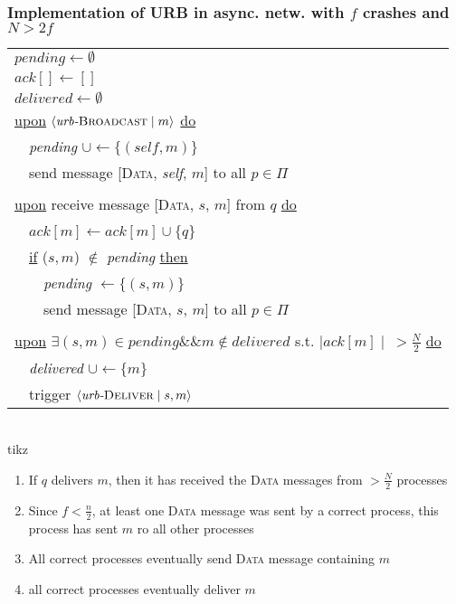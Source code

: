 \documentclass{article}
\begin{document}
\begin{adjustwidth}{2em}{2em}
\begin{adjustwidth}{2em}{2em}
			\subsubsection{Implementation of URB in async. netw. with $f$ crashes and $N > 2f$}					
			\begin{center}
				\begin{tabular}{l}
					$\textit{pending} \leftarrow \emptyset$ \\
					$ack[] \leftarrow []$ \\
					$\textit{delivered} \leftarrow \emptyset$
					\\
					\underline{upon} $\langle \textit{urb-}\textsc{Broadcast} \mid m \rangle$ \underline{do} \\
					\ \ \textit{pending} $\cup \leftarrow \{ (\textit{self}, m) \}$ \\
					\ \ send message [\textsc{Data}, \textit{self}, $m$] to all $p \in \Pi$ \\
					\\
					\underline{upon} receive message [\textsc{Data}, $s$, $m$] from $q$ \underline{do} \\
					\ \ $ack[m] \leftarrow ack[m] \cup \{ q \}$ \\
					\ \ \underline{if} ($s,m$) $\not\in$ \textit{pending} \underline{then} \\
					\ \ \ \ \textit{pending} $\leftarrow \{ (s,m) \}$ \\
					\ \ \ \ send message [\textsc{Data}, $s$, $m$] to all $p \in \Pi$ \\
					\\
					\underline{upon} $\exists(s,m) \in \textit{pending} \&\& m \not\in \textit{delivered}$ s.t. $\mid ack[m] \mid \ > \frac{N}{2}$ \underline{do} \\
					\ \ \textit{delivered} $\cup\leftarrow \{ m \}$ \\
					\ \ trigger $\langle \textit{urb-}\textsc{Deliver} \mid s,m \rangle$
				\end{tabular}
				\hfill \\
				tikz
			\end{center}
			\begin{adjustwidth}{2em}{}
				\begin{enumerate}[\small{\textbullet}]
					\item If $q$ delivers $m$, then it has received the \textsc{Data} messages from $> \frac{N}{2}$ processes
					\item Since $f < \frac{n}{2}$, at least one \textsc{Data} message was sent by a correct process, this process has sent $m$ ro all other processes
					\item All correct processes eventually send \textsc{Data} message containing $m$
					\item all correct processes eventually deliver $m$
				\end{enumerate}
			\end{adjustwidth}
		\end{adjustwidth}

\end{adjustwidth}
\end{document}
